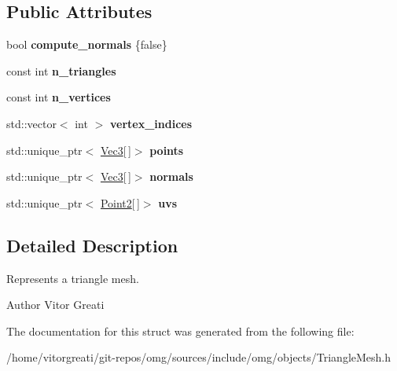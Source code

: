 \subsection*{Public Attributes}
\begin{DoxyCompactItemize}
\item 
\mbox{\label{structomg_1_1_triangle_mesh_a67bbcb1d89af858be82c48c92255db3c}} 
bool {\bfseries compute\+\_\+normals} \{false\}
\item 
\mbox{\label{structomg_1_1_triangle_mesh_a7ead07a90b3a63a39103f10f64958f84}} 
const int {\bfseries n\+\_\+triangles}
\item 
\mbox{\label{structomg_1_1_triangle_mesh_a2a411a56a3a866435604845a7e01cfcc}} 
const int {\bfseries n\+\_\+vertices}
\item 
\mbox{\label{structomg_1_1_triangle_mesh_ae98575726e9ed88cb9c20bfccef66094}} 
std\+::vector$<$ int $>$ {\bfseries vertex\+\_\+indices}
\item 
\mbox{\label{structomg_1_1_triangle_mesh_abaa3dc4be890e4a08ee2267d52e25404}} 
std\+::unique\+\_\+ptr$<$ \mbox{\hyperlink{namespaceomg_a45a9482677fee9933ff369b49894e316}{Vec3}}\mbox{[}$\,$\mbox{]}$>$ {\bfseries points}
\item 
\mbox{\label{structomg_1_1_triangle_mesh_ab04183e23af3c094145e26a363f9bdfa}} 
std\+::unique\+\_\+ptr$<$ \mbox{\hyperlink{namespaceomg_a45a9482677fee9933ff369b49894e316}{Vec3}}\mbox{[}$\,$\mbox{]}$>$ {\bfseries normals}
\item 
\mbox{\label{structomg_1_1_triangle_mesh_a7ed2552b0fb9512c6ed04664ac559be3}} 
std\+::unique\+\_\+ptr$<$ \mbox{\hyperlink{namespaceomg_a18e42fb7bbc4159e9137145b866ec578}{Point2}}\mbox{[}$\,$\mbox{]}$>$ {\bfseries uvs}
\end{DoxyCompactItemize}


\subsection{Detailed Description}
Represents a triangle mesh. 

\begin{DoxyAuthor}{Author}
Vitor Greati 
\end{DoxyAuthor}


The documentation for this struct was generated from the following file\+:\begin{DoxyCompactItemize}
\item 
/home/vitorgreati/git-\/repos/omg/sources/include/omg/objects/Triangle\+Mesh.\+h\end{DoxyCompactItemize}
